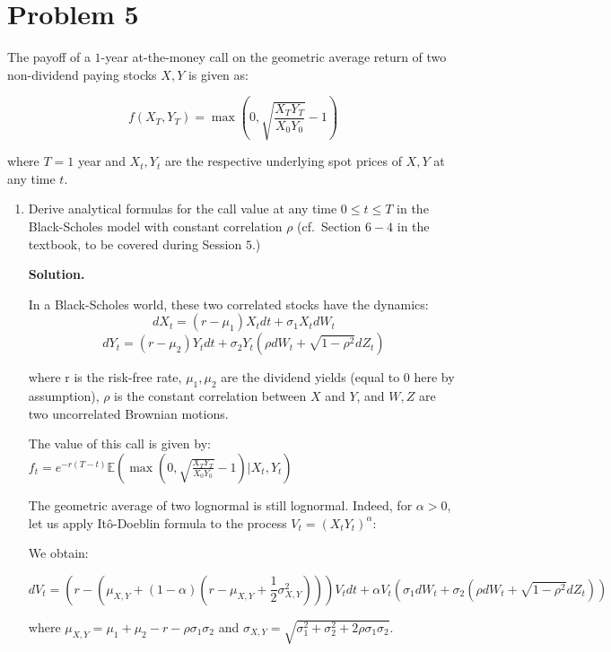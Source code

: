 \documentclass[12pt]{article}
\newenvironment{solution}{\vspace{0.2cm} \textbf{Solution.}}{}
\begin{document}
\newpage

\section*{Problem 5}
The payoff of a $1$-year at-the-money call on the geometric average return of two non-dividend paying stocks $X, Y$ is given as:

$$ f(X_T,Y_T) = \max\left(0, \sqrt{\frac{X_T Y_T}{X_0 Y_0}} - 1\right)$$

where $T = 1$ year and $X_t, Y_t$ are the respective underlying spot prices of $X, Y$ at any time $t$.
	
	\begin{enumerate}[label=(\alph*)]
		
		\item Derive analytical formulas for the call value at any time $0 \leq t \leq T$ in the Black-Scholes model with constant correlation $\rho$ (cf.\ Section $6-4$ in the textbook, to be covered during Session $5$.)
		
		\begin{solution}
			
			In a Black-Scholes world, these two correlated stocks have the dynamics:
			$$ dX_t = (r-\mu_1) X_t dt + \sigma_1 X_t dW_t$$
			$$ dY_t = (r-\mu_2) Y_t dt + \sigma_2 Y_t (\rho dW_t + \sqrt{1 - \rho^2}dZ_t)$$
			
			where r is the risk-free rate, $\mu_1, \mu_2$ are the dividend yields (equal to 0 here by assumption), $\rho$ is the constant correlation between $X$ and $Y$, and $W,Z$ are two uncorrelated Brownian motions.
			
			The value of this call is given by: $f_t = e^{-r(T-t)} \mathbb{E}\left(\max\left(0, \sqrt{\frac{X_T Y_T}{X_0 Y_0}} - 1\right) \vert X_t,Y_t \right)$
			
			The geometric average of two lognormal is still lognormal. Indeed, for $\alpha > 0$, let us apply Itô-Doeblin formula to the process $V_t = (X_tY_t)^{\alpha}$:
			
			We obtain:
			
			\begin{dmath*}
			dV_t = \left(r - \left(\mu_{X,Y} + \left(1-\alpha\right) \left(r - \mu_{X,Y} + \frac{1}{2} \sigma_{X,Y}^2 \right)\right)\right) V_t dt + \alpha V_t \left( \sigma_1 dW_t + \sigma_2 \left(\rho dW_t + \sqrt{1 - \rho^2}dZ_t \right)\right)
			\end{dmath*}
		
			where $\mu_{X,Y} = \mu_1 + \mu_2 -r -\rho \sigma_1 \sigma_2$ and $\sigma_{X,Y} = \sqrt{\sigma_1^2 + \sigma_2^2 + 2\rho \sigma_1 \sigma_2}$.
			

\end{solution}
\end{enumerate}
\end{document}
